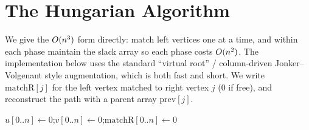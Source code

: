 \section{The Hungarian Algorithm}
\label{ch16:algorithm}

We give the $\Oh(n^3)$ form directly: match left vertices one at a time, and within each phase maintain the slack array so each phase costs $O(n^2)$. The implementation below uses the standard ``virtual root'' / column-driven Jonker--Volgenant style augmentation, which is both fast and short. We write $\mathrm{matchR}[j]$ for the left vertex matched to right vertex $j$ ($0$ if free), and reconstruct the path with a parent array $\mathrm{prev}[j]$.

\begin{algorithm}[H]
\DontPrintSemicolon
\caption{Hungarian algorithm (min-cost perfect assignment, $\Oh(n^3)$)}
$u[0..n]\gets 0$;\quad $v[0..n]\gets 0$;\quad $\mathrm{matchR}[0..n]\gets 0$\;
\;
\end{algorithm}

